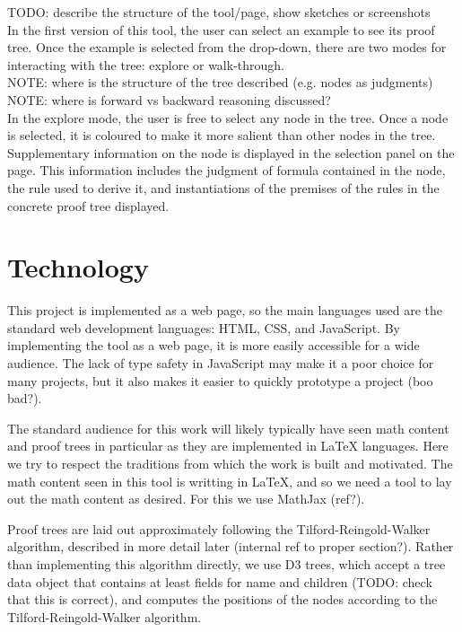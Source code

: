 \documentclass[conference]{IEEEtran}
\begin{document}
TODO: describe the structure of the tool/page, show sketches or screenshots \\

In the first version of this tool, the user can select an example to see its proof tree. Once the example is selected from the drop-down, there are two modes for interacting with the tree: explore or walk-through. \\

NOTE: where is the structure of the tree described (e.g. nodes as judgments) \\

NOTE: where is forward vs backward reasoning discussed? \\

In the explore mode, the user is free to select any node in the tree. Once a node is selected, it is coloured to make it more salient than other nodes in the tree. Supplementary information on the node is displayed in the selection panel on the page. This information includes the judgment of formula contained in the node, the rule used to derive it, and instantiations of the premises of the rules in the concrete proof tree displayed.

\section{Technology}

This project is implemented as a web page, so the main languages used are the standard web development languages: HTML, CSS, and JavaScript. By implementing the tool as a web page, it is more easily accessible for a wide audience. The lack of type safety in JavaScript may make it a poor choice for many projects, but it also makes it easier to quickly prototype a project (boo bad?).

The standard audience for this work will likely typically have seen math content and proof trees in particular as they are implemented in \LaTeX{} languages. Here we try to respect the traditions from which the work is built and motivated. The math content seen in this tool is writting in \LaTeX{}, and so we need a tool to lay out the math content as desired. For this we use MathJax (ref?).

Proof trees are laid out approximately following the Tilford-Reingold-Walker algorithm, described in more detail later (internal ref to proper section?). Rather than implementing this algorithm directly, we use D3 trees, which accept a tree data object that contains at least fields for name and children (TODO: check that this is correct), and computes the positions of the nodes according to the Tilford-Reingold-Walker algorithm.
\end{document}
